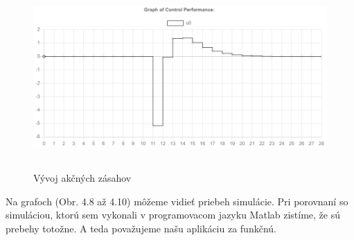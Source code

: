 \begin{figure}[H]
	\centering
	\includegraphics[width=13cm,height=7cm]{images/Hmotny_bod_apk/u}
	\caption{Vývoj akčných zásahov}
\end{figure}
Na grafoch (Obr. 4.8 až 4.10) môžeme vidieť priebeh simulácie. Pri porovnaní so simuláciou, ktorú sem vykonali v programovacom jazyku Matlab zistíme, že sú prebehy totožne. A teda považujeme našu aplikáciu za funkčnú. 